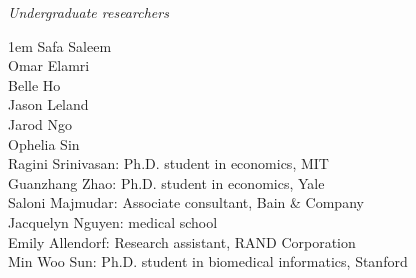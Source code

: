 \documentclass[10.9pt]{article}
\makeatletter
\newcommand\donotbreakhere{\par\nobreak\@afterheading\vspace{1em}}
\newenvironment{indnt}{\begin{adjustwidth}{1em}{}}{\end{adjustwidth}}
\makeatother
\begin{document}
 {\large\it \hspace{.15em} Undergraduate researchers}\donotbreakhere
\begin{indnt}\vspace{-.35em}
Safa Saleem  \\[.5em]
Omar Elamri \\[.5em]
Belle Ho \\[.5em]
Jason Leland\\[.5em]
Jarod Ngo\\[.5em]
Ophelia Sin\\[.5em]
Ragini Srinivasan: Ph.D. student in economics, MIT \\[.5em]
Guanzhang Zhao: Ph.D. student in economics, Yale \\[.5em]
Saloni Majmudar: Associate consultant, Bain \& Company\\[.5em]
Jacquelyn Nguyen: medical school\\[.5em]
Emily Allendorf: Research assistant, RAND Corporation\\[.5em]
Min Woo Sun: Ph.D. student in biomedical informatics, Stanford
\end{indnt}

\vspace{1.5em}
\end{document}
